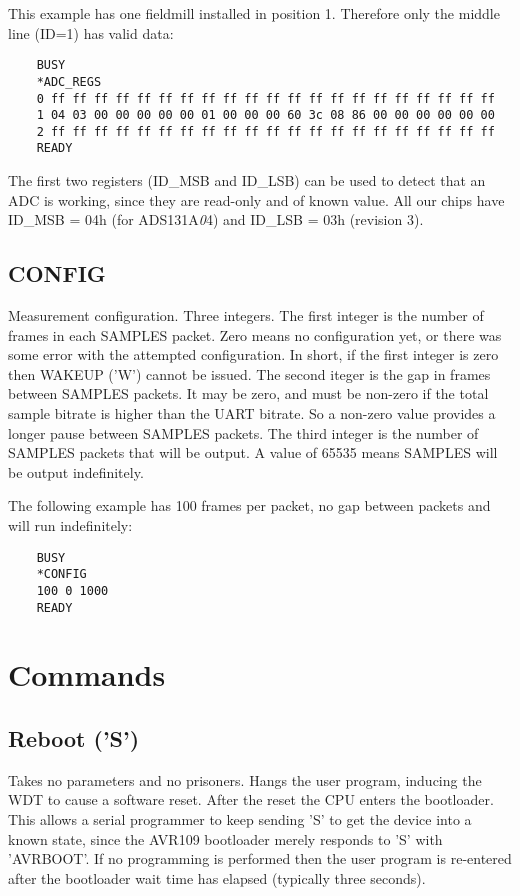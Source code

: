 \documentclass{article}
\begin{document}
This example has one fieldmill installed in position 1.
Therefore only the middle line (ID=1) has valid data:

\begin{lstlisting}
    BUSY
    *ADC_REGS
    0 ff ff ff ff ff ff ff ff ff ff ff ff ff ff ff ff ff ff ff ff ff
    1 04 03 00 00 00 00 00 01 00 00 00 60 3c 08 86 00 00 00 00 00 00
    2 ff ff ff ff ff ff ff ff ff ff ff ff ff ff ff ff ff ff ff ff ff
    READY
\end{lstlisting}

The first two registers (ID\_MSB and ID\_LSB) can be used to detect that an ADC is working,
since they are read-only and of known value.
All our chips have ID\_MSB = 04h (for ADS131A{\emph 04}) and ID\_LSB = 03h (revision 3).

\subsection{CONFIG}

Measurement configuration. Three integers.
The first integer is the number of frames in each SAMPLES packet.
Zero means no configuration yet, or there was some error with the attempted configuration.
In short, if the first integer is zero then WAKEUP ('W') cannot be issued.
The second iteger is the gap in frames between SAMPLES packets.
It may be zero, and must be non-zero if the total sample bitrate is higher than the UART bitrate.
So a non-zero value provides a longer pause between SAMPLES packets.
The third integer is the number of SAMPLES packets that will be output.
A value of 65535 means SAMPLES will be output indefinitely.

The following example has 100 frames per packet, no gap between packets and will run indefinitely:

\begin{lstlisting}
    BUSY
    *CONFIG
    100 0 1000
    READY
\end{lstlisting}

\section{Commands}

\subsection{Reboot ('S')}

Takes no parameters and no prisoners.
Hangs the user program, inducing the WDT to cause a software reset.
After the reset the CPU enters the bootloader.
This allows a serial programmer to keep sending 'S' to get the device into a known state,
since the AVR109 bootloader merely responds to 'S' with 'AVRBOOT'.
If no programming is performed then the user program is re-entered after the bootloader wait time has elapsed (typically three seconds).
\end{document}
